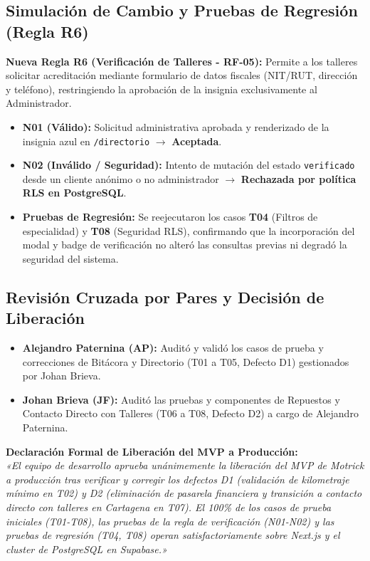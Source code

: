 \documentclass[11pt,letterpaper]{article}
\begin{document}
\subsection{Simulación de Cambio y Pruebas de Regresión (Regla R6)}
\textbf{Nueva Regla R6 (Verificación de Talleres - RF-05):} Permite a los talleres solicitar acreditación mediante formulario de datos fiscales (NIT/RUT, dirección y teléfono), restringiendo la aprobación de la insignia exclusivamente al Administrador.
\begin{itemize}
    \item \textbf{N01 (Válido):} Solicitud administrativa aprobada y renderizado de la insignia azul en \texttt{/directorio} $\rightarrow$ \textbf{Aceptada}.
    \item \textbf{N02 (Inválido / Seguridad):} Intento de mutación del estado \texttt{verificado} desde un cliente anónimo o no administrador $\rightarrow$ \textbf{Rechazada por política RLS en PostgreSQL}.
    \item \textbf{Pruebas de Regresión:} Se reejecutaron los casos \textbf{T04} (Filtros de especialidad) y \textbf{T08} (Seguridad RLS), confirmando que la incorporación del modal y badge de verificación no alteró las consultas previas ni degradó la seguridad del sistema.
\end{itemize}

\subsection{Revisión Cruzada por Pares y Decisión de Liberación}
\begin{itemize}
    \item \textbf{Alejandro Paternina (AP):} Auditó y validó los casos de prueba y correcciones de Bitácora y Directorio (T01 a T05, Defecto D1) gestionados por Johan Brieva.
    \item \textbf{Johan Brieva (JF):} Auditó las pruebas y componentes de Repuestos y Contacto Directo con Talleres (T06 a T08, Defecto D2) a cargo de Alejandro Paternina.
\end{itemize}

\begin{successcallout}
\textbf{Declaración Formal de Liberación del MVP a Producción:}\\
\textit{«El equipo de desarrollo aprueba unánimemente la liberación del MVP de Motrick a producción tras verificar y corregir los defectos D1 (validación de kilometraje mínimo en T02) y D2 (eliminación de pasarela financiera y transición a contacto directo con talleres en Cartagena en T07). El 100\% de los casos de prueba iniciales (T01-T08), las pruebas de la regla de verificación (N01-N02) y las pruebas de regresión (T04, T08) operan satisfactoriamente sobre Next.js y el cluster de PostgreSQL en Supabase.»}
\end{successcallout}
\end{document}
